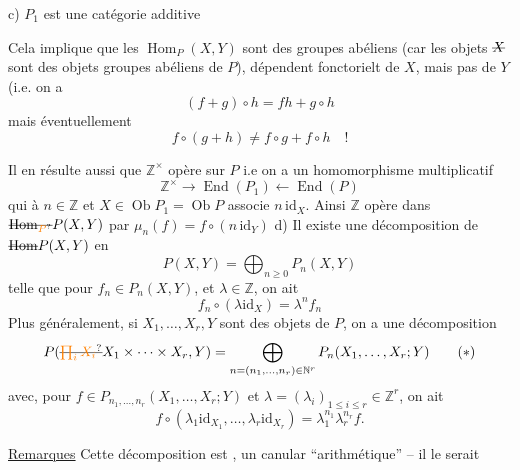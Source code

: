 c) $P_1$ est une catégorie additive

Cela implique que  les $\operatorname{Hom}_P(X,Y)$
sont des groupes abéliens (car les objets $\deleted{X}$ sont
des objets groupes abéliens de $P$), dépendent
fonctorielt de $X$, mais pas de $Y$
(i.e. on a
\[
\boxed{(f+g)\circ h=fh+g\circ h}
\]
mais  éventuellement
\[
f\circ(g+h)\ne f\circ g+f\circ h\quad !
\]

Il en résulte aussi que $\mathbb Z^\times$ opère sur $P$
i.e on a un homomorphisme multiplicatif
\[
\mathbb Z^\times\longrightarrow\operatorname{End}(P_1)\longleftarrow\operatorname{End}(P)
\]
qui à $n\in\mathbb Z$ et $X\in\operatorname{Ob}P_1=\operatorname{Ob}P$ associe $n\,\mathrm{id}_X$.
Ainsi $\mathbb Z$ opère dans $\deleted{\operatorname{Hom}_{\unsure{P}}}P(X,Y)$ par
$\mu_n(f)=f\circ(n\,\mathrm{id}_Y)$
d) Il existe une décomposition de $\deleted{\operatorname{Hom}}P(X,Y)$
en
\[
P(X,Y)=\bigoplus_{n\geq0}P_n(X,Y)
\]
telle que pour $f_n\in P_n(X,Y)$, et $\lambda\in\mathbb Z$, on ait
\[
f_n\circ(\lambda\mathrm{id}_X)=\lambda^nf_n \tag*{$*$}
\]
Plus généralement, si $X_1,\ldots,X_r,Y$ sont des
objets de $P$, on a une décomposition
\[
P(\deleted{\unsure{\prod_i X_i}}X_1\times\cdots\times X_r,Y)=
\bigoplus_{n=(n_1,\ldots,n_r)\in\mathbb N^r}P_n(X_1,\ldots,X_r;Y)\tag*{($*$)}
\]
avec, pour $f\in P_{n_1,\ldots,n_r}(X_1,\ldots,X_r;Y)$ et $\lambda=(\lambda_i)_{1\leq i\leq r}\in\mathbb Z^r$,
on ait
\[
f\circ(\lambda_1\mathrm{id}_{X_1},\ldots,\lambda_r\mathrm{id}_{X_r})
=\lambda_1^{n_1}\lambda_r^{n_r}f.
\]


\uline{Remarques} Cette décomposition est  , un
 canular ``arithmétique'' -- il le serait

